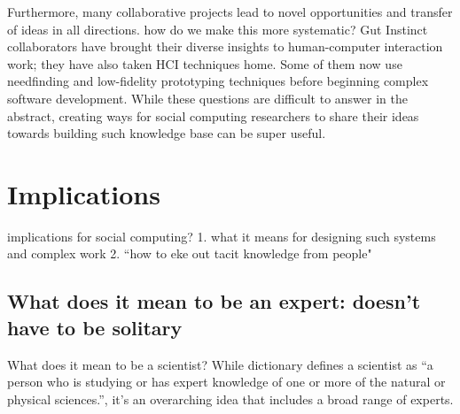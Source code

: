Furthermore, many collaborative projects lead to novel opportunities and transfer of ideas in all directions. how do we make this more systematic? Gut Instinct collaborators have brought their diverse insights to human-computer interaction work; they have also taken HCI techniques home. Some of them now use needfinding and low-fidelity prototyping techniques before beginning complex software development. While these questions are difficult to answer in the abstract, creating ways for social computing researchers to share their ideas towards building such knowledge base can be super useful.    %




\section{Implications}

implications for social computing?
1. what it means for designing such systems and complex work
2. “how to eke out tacit knowledge from people"

\subsection{What does it mean to be an expert: doesn’t have to be solitary} 
What does it mean to be a scientist? While dictionary defines a scientist as “a person who is studying or has expert knowledge of one or more of the natural or physical sciences.”, it’s an overarching idea that includes a broad range of experts. 

